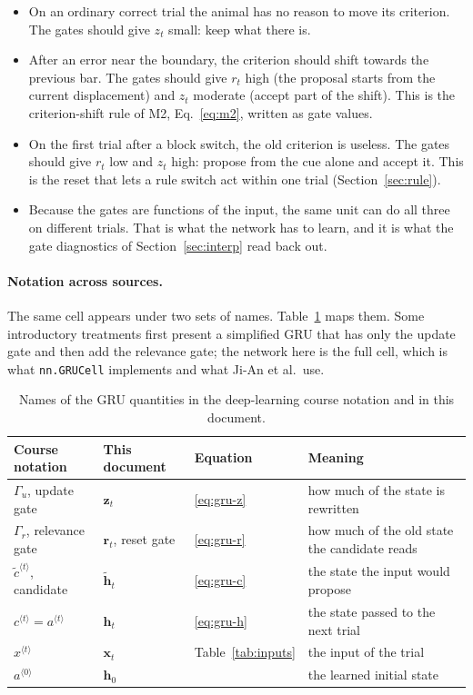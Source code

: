 \documentclass[11pt,a4paper]{article}
\newcommand{\vect}[1]{\bm{#1}}
\begin{document}
\begin{itemize}[leftmargin=*]
\item On an ordinary correct trial the animal has no reason to move its criterion. The
      gates should give $z_t$ small: keep what there is.
\item After an error near the boundary, the criterion should shift towards the previous
      bar. The gates should give $r_t$ high (the proposal starts from the current
      displacement) and $z_t$ moderate (accept part of the shift). This is the
      criterion-shift rule of M2, Eq.~\eqref{eq:m2}, written as gate values.
\item On the first trial after a block switch, the old criterion is useless. The gates
      should give $r_t$ low and $z_t$ high: propose from the cue alone and accept it.
      This is the reset that lets a rule switch act within one trial
      (Section~\ref{sec:rule}).
\item Because the gates are functions of the input, the same unit can do all three on
      different trials. That is what the network has to learn, and it is what the gate
      diagnostics of Section~\ref{sec:interp} read back out.
\end{itemize}

\paragraph{Notation across sources.} The same cell appears under two sets of names.
Table~\ref{tab:gru-notation} maps them. Some introductory treatments first present a
simplified GRU that has only the update gate and then add the relevance gate; the
network here is the full cell, which is what \texttt{nn.GRUCell} implements and what
Ji-An et al.\ use.

\begin{table}[H]
  \centering\small
  \caption{Names of the GRU quantities in the deep-learning course notation and in
  this document.}
  \label{tab:gru-notation}
  \begin{tabular}{llll}
    \toprule
    Course notation & This document & Equation & Meaning \\
    \midrule
    $\Gamma_u$, update gate     & $\vect{z}_t$        & \eqref{eq:gru-z} & how much of the state is rewritten \\
    $\Gamma_r$, relevance gate  & $\vect{r}_t$, reset gate & \eqref{eq:gru-r} & how much of the old state the candidate reads \\
    $\tilde{c}^{\langle t\rangle}$, candidate & $\tilde{\vect{h}}_t$ & \eqref{eq:gru-c} & the state the input would propose \\
    $c^{\langle t\rangle} = a^{\langle t\rangle}$ & $\vect{h}_t$ & \eqref{eq:gru-h} & the state passed to the next trial \\
    $x^{\langle t\rangle}$      & $\vect{x}_t$        & Table~\ref{tab:inputs} & the input of the trial \\
    $a^{\langle 0\rangle}$      & $\vect{h}_0$        & & the learned initial state \\
    \bottomrule
  \end{tabular}
\end{table}
\end{document}
